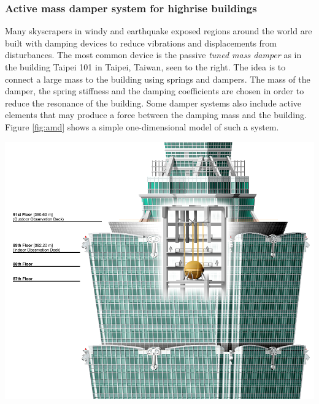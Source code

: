 \documentclass[letterpaper,11pt]{article}
\begin{document}
\subsubsection*{Active mass damper system for highrise buildings}
\noindent
\begin{minipage}{0.6\linewidth}
Many skyscrapers in windy and earthquake exposed regions around the world are built with damping devices to reduce vibrations and displacements from disturbances. The most common device is the passive \emph{tuned mass damper} as in the building Taipei 101 in Taipei, Taiwan, seen to the right. The idea is to connect a large mass to the building using springs and dampers. The mass of the damper, the spring stiffness and the damping coefficients are chosen in order to reduce the resonance of the building. Some damper systems also include active elements that may produce a force between the damping mass and the building. Figure \ref{fig:amd} shows a simple one-dimensional model of such a system.
\end{minipage}
\begin{minipage}{0.4\linewidth}
\begin{center}
\includegraphics[width=\linewidth]{taipei-101.png}
\end{center}
\end{minipage}
\clearpage
\end{document}
